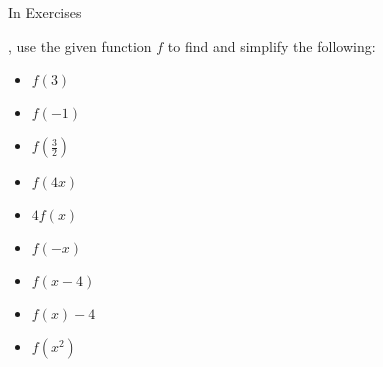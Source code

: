 {\noindent In Exercises}
{, use the given function $f$ to find and simplify the following:

\begin{multicols}{2}
\begin{itemize}
\item $f(3)$
\item $f(-1)$
\item $f\left(\frac{3}{2} \right)$
\item  $f(4x)$
\item $4f(x)$
\item $f(-x)$
\item  $f(x-4)$
\item $f(x) - 4$
\item  $f\left(x^2\right)$
\end{itemize}
\end{multicols}
}
